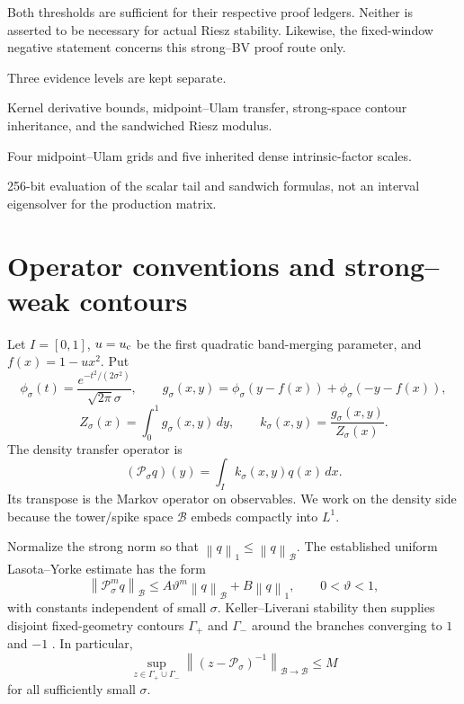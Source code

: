 \documentclass[11pt]{article}
\theoremstyle{remark}
\newcommand{\cB}{\mathcal B}
\newcommand{\cP}{\mathcal P}
\newcommand{\norm}[1]{\left\lVert #1\right\rVert}
\begin{document}
Both thresholds are sufficient for their respective proof ledgers.  Neither
is asserted to be necessary for actual Riesz stability.  Likewise, the
fixed-window negative statement concerns this strong--BV proof route only.

Three evidence levels are kept separate.
\begin{description}[leftmargin=3.6cm,style=nextline]
 \item[Analytic theorem]
 Kernel derivative bounds, midpoint--Ulam transfer, strong-space contour
 inheritance, and the sandwiched Riesz modulus.
 \item[Binary64 diagnostic]
 Four midpoint--Ulam grids and five inherited dense intrinsic-factor scales.
 \item[Arb arithmetic audit]
 256-bit evaluation of the scalar tail and sandwich formulas, not an
 interval eigensolver for the production matrix.
\end{description}

\section{Operator conventions and strong--weak contours}

Let $I=[0,1]$, $u=u_{\rm c}$ be the first quadratic band-merging parameter,
and $f(x)=1-ux^2$.  Put
\[
 \phi_\sigma(t)=\frac{e^{-t^2/(2\sigma^2)}}{\sqrt{2\pi}\sigma},
 \qquad
 g_\sigma(x,y)=\phi_\sigma(y-f(x))+\phi_\sigma(-y-f(x)),
\]
\[
 Z_\sigma(x)=\int_0^1g_\sigma(x,y)\,dy,
 \qquad
 k_\sigma(x,y)=\frac{g_\sigma(x,y)}{Z_\sigma(x)}.
\]
The density transfer operator is
\begin{equation}
 (\cP_\sigma q)(y)=\int_I k_\sigma(x,y)q(x)\,dx.
 \label{eq:density-operator}
\end{equation}
Its transpose is the Markov operator on observables.  We work on the density
side because the tower/spike space $\cB$ embeds compactly into $L^1$.

Normalize the strong norm so that
$\norm q_1\le\norm q_{\cB}$.  The established uniform Lasota--Yorke
estimate has the form
\begin{equation}
 \norm{\cP_\sigma^m q}_{\cB}
 \le A\vartheta^m\norm q_{\cB}+B\norm q_1,
 \qquad 0<\vartheta<1,
 \label{eq:lasota-yorke}
\end{equation}
with constants independent of small $\sigma$.  Keller--Liverani stability
then supplies disjoint fixed-geometry contours $\Gamma_+$ and $\Gamma_-$
around the branches converging to $1$ and $-1$ \citep{KellerLiverani1999}.
In particular,
\begin{equation}
 \sup_{z\in\Gamma_+\cup\Gamma_-}
 \norm{(z-\cP_\sigma)^{-1}}_{\cB\to\cB}\le M
 \label{eq:strong-resolvent}
\end{equation}
for all sufficiently small $\sigma$.
\end{document}
